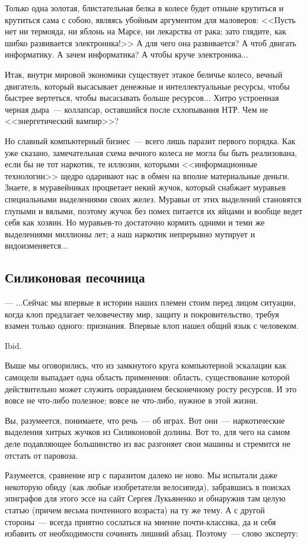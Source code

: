 \documentclass{scrbook}
\makeatletter
\newcommand{\defaultepigraphwidth}{0.5} %
\newcommand{\flqq}{<<}
\newcommand{\frqq}{>>}
\newcommand{\mdash}{~--- }
\newcommand{\sdash}{--- } %
\newcommand{\essaysection}[1]{\subsection*{#1}\nopagebreak}
\newcommand{\myepigraph}[3][\@empty]{
	\ifx\@empty#1
		\setlength{\epigraphwidth}{\defaultepigraphwidth\textwidth}
	\else
		\setlength{\epigraphwidth}{#1\textwidth}
	\fi
	\epigraph{#2}{#3}
	\setlength{\epigraphwidth}{\defaultepigraphwidth\textwidth} %
	\nopagebreak
}
\makeatother
\begin{document}
Только одна золотая, блистательная белка в колесе будет отныне крутиться и крутиться сама с собою, являясь убойным аргументом для маловеров: {\flqq}Пусть нет ни термояда, ни яблонь на Марсе, ни лекарства от рака; зато глядите, как шибко развивается электроника!{\frqq} А для чего она развивается? А чтоб двигать информатику. А зачем информатика? А чтобы круче электроника...

Итак, внутри мировой экономики существует этакое беличье колесо, вечный двигатель, который высасывает денежные и интеллектуальные ресурсы, чтобы быстрее вертеться, чтобы высасывать больше ресурсов... Хитро устроенная черная дыра{\mdash}коллапсар, оставшийся после схлопывания НТР. Чем не {\flqq}энергетический вампир{\frqq}?

Но славный компьютерный бизнес{\mdash}всего лишь паразит первого порядка. Как уже сказано, замечательная схема вечного колеса не могла бы быть реализована, если бы не тот наркотик, те иллюзии, которыми {\flqq}информационные технологии{\frqq} щедро одаривают нас в обмен на вполне материальные деньги. Знаете, в муравейниках процветает некий жучок, который снабжает муравьев специальными выделениями своих желез. Муравьи от этих выделений становятся глупыми и вялыми, поэтому жучок без помех питается их яйцами и вообще ведет себя как хозяин. Но муравьев-то достаточно кормить одними и теми же выделениями миллионы лет; а наш наркотик непрерывно мутирует и видоизменяется...

\essaysection{Силиконовая песочница}

\myepigraph{{\sdash} ...Сейчас мы впервые в истории наших племен стоим перед лицом ситуации, когда клоп предлагает человечеству мир, защиту и покровительство, требуя взамен только одного: признания. Впервые клоп нашел общий язык с человеком.}
{Ibid.}

Выше мы оговорились, что из замкнутого круга компьютерной эскалации как самоцели выпадает одна область применения: область, существование которой действительно может служить оправданием бесконечному росту ресурсов.
И это вовсе не что-либо полезное; вовсе не что-либо, нужное в этой жизни.

Вы, разумеется, понимаете, что речь{\mdash}об играх. Вот они{\mdash}наркотические выделения хитрых жучков из Силиконовой долины. Вот то, для чего на самом деле подавляющее большинство из вас разгоняет свои машины и стремится не отстать от паровоза.

Разумеется, сравнение игр с паразитом далеко не ново. Мы испытали даже некоторую обиду (как любые изобретатели велосипеда), забравшись в поисках эпиграфов для этого эссе на сайт Сергея Лукьяненко и обнаружив там целую статью (причем весьма почтенного возраста) на ту же тему. А с другой стороны{\mdash}всегда приятно сослаться на мнение почти-классика, да и себя избавить от необходимости сочинять лишний абзац. Поэтому{\mdash}слово эксперту:
\end{document}
